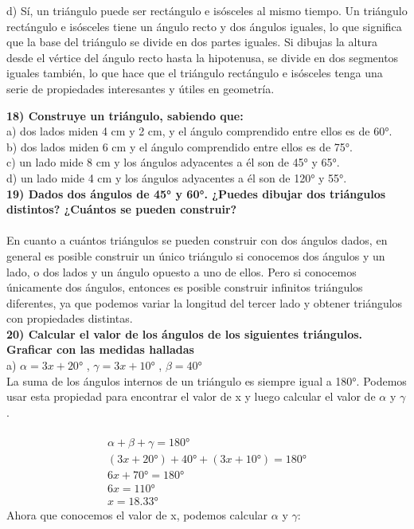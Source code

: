\documentclass{article}
\begin{document}
d) Sí, un triángulo puede ser rectángulo e isósceles al mismo tiempo. Un triángulo rectángulo e isósceles tiene un ángulo recto y dos ángulos iguales, lo que significa que la base del triángulo se divide en dos partes iguales. Si dibujas la altura desde el vértice del ángulo recto hasta la hipotenusa, se divide en dos segmentos iguales también, lo que hace que el triángulo rectángulo e isósceles tenga una serie de propiedades interesantes y útiles en geometría.

{\bf 18) Construye un triángulo, sabiendo que: }\\
a) dos lados miden 4 cm y 2 cm, y el ángulo comprendido entre ellos es de 60°.\\
b) dos lados miden 6 cm y el ángulo comprendido entre ellos es de 75°.\\
c) un lado mide 8 cm y los ángulos adyacentes a él son de 45° y 65°.\\
d) un lado mide 4 cm y los ángulos adyacentes a él son de 120° y 55°.\\

{\bf 19) Dados dos ángulos de 45° y 60°. ¿Puedes dibujar dos triángulos distintos? ¿Cuántos se pueden construir? } \\ 
\\
En cuanto a cuántos triángulos se pueden construir con dos ángulos dados, en general es posible construir un único triángulo si conocemos dos ángulos y un lado, o dos lados y un ángulo opuesto a uno de ellos. Pero si conocemos únicamente dos ángulos, entonces es posible construir infinitos triángulos diferentes, ya que podemos variar la longitud del tercer lado y obtener triángulos con propiedades distintas. \\

{\bf 20) Calcular el valor de los ángulos de los siguientes triángulos. Graficar con las medidas halladas } \\ 

a) $\alpha = 3x+20°$ , 
$\gamma = 3x+10°$ ,
$\beta = 40°$ 
\\ 
La suma de los ángulos internos de un triángulo es siempre igual a 180°. Podemos usar esta propiedad para encontrar el valor de x y luego calcular el valor de $\alpha$ y $\gamma$.\\
\\

\begin{equation}
\begin{array}{l}
\alpha + \beta + \gamma = 180° \\
(3x + 20°) + 40° + (3x + 10°) = 180°\\
6x + 70° = 180°\\
6x = 110°\\
x = 18.33°
\end{array}
\end{equation}
Ahora que conocemos el valor de x, podemos calcular $\alpha$ y $\gamma$:\\
\end{document}
